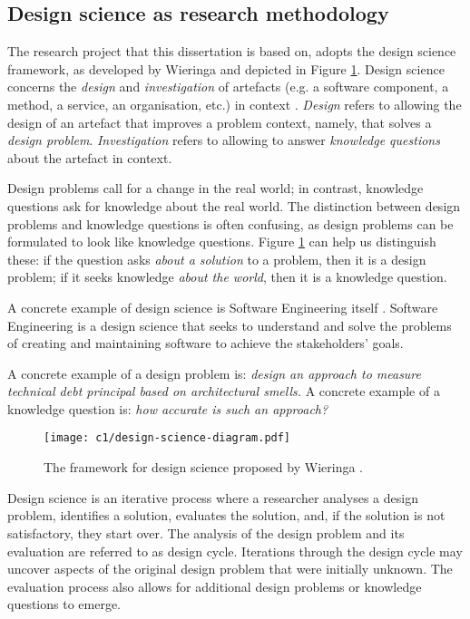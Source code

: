 \subsection{Design science as research methodology}
The research project that this dissertation is based on, adopts the design science framework, as developed by Wieringa \cite{Wieringa2014} and depicted in Figure \ref{fig:design-science}.
Design science concerns the \emph{design} and \emph{investigation} of artefacts (e.g. a software component, a method, a service, an organisation, etc.) in context \cite{Wieringa2014}.
\emph{Design} refers to allowing the design of an artefact that improves a problem context, namely, that solves a \emph{design problem}. 
\emph{Investigation} refers to allowing to answer \emph{knowledge questions} about the artefact in context.

Design problems call for a change in the real world; in contrast, knowledge questions ask for knowledge about the real world.
The distinction between design problems and knowledge questions is often confusing, as design problems can be formulated to look like knowledge questions.
Figure \ref{fig:design-science} can help us distinguish these: if the question asks  \emph{about a solution} to a problem, then it is a design problem; if it seeks knowledge \emph{about the world}, then it is a knowledge question.

A concrete example of design science is Software Engineering itself \cite{Wieringa2014}.
Software Engineering is a design science that seeks to understand and solve the problems of creating and maintaining software to achieve the stakeholders' goals.

A concrete example of a design problem is: \emph{design an approach to measure technical debt principal based on architectural smells.}
A concrete example of a knowledge question is: \emph{how accurate is such an approach?}

\begin{figure}
    \centering
    \texttt{[image: c1/design-science-diagram.pdf]}
    \caption{The framework for design science proposed by Wieringa \cite{Wieringa2014}.}\label{fig:design-science}
\end{figure}

Design science is an iterative process where a researcher analyses a design problem, identifies a solution, evaluates the solution, and, if the solution is not satisfactory, they start over. 
The analysis of the design problem and its evaluation are referred to as design cycle.
Iterations through the design cycle may uncover aspects of the original design problem that were initially unknown.
The evaluation process also allows for additional design problems or knowledge questions to emerge.

